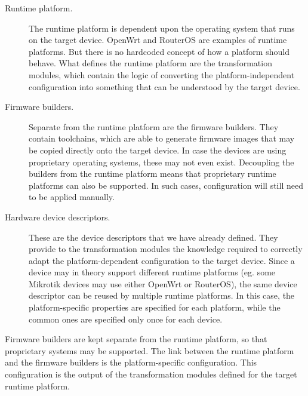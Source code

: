 \documentclass[5p,sort&compress]{elsarticle}
\begin{document}
\begin{description}
    \item[Runtime platform.] The runtime platform is dependent upon the operating system that runs on the target device.
    OpenWrt and RouterOS are examples of runtime platforms.
    But there is no hardcoded concept of how a platform should behave.
    What defines the runtime platform are the transformation modules, which contain the logic of converting the platform-independent configuration into something that can be understood by the target device.

    \item[Firmware builders.] Separate from the runtime platform are the firmware builders.
    They contain toolchains, which are able to generate firmware images that may be copied directly onto the target device.
    In case the devices are using proprietary operating systems, these may not even exist.
    Decoupling the builders from the runtime platform means that proprietary runtime platforms can also be supported.
    In such cases, configuration will still need to be applied manually.

    \item[Hardware device descriptors.] These are the device descriptors that we have already defined.
    They provide to the transformation modules the knowledge required to correctly adapt the platform-dependent configuration to the target device.
    Since a device may in theory support different runtime platforms (eg. some Mikrotik devices may use either OpenWrt or RouterOS), the same device descriptor can be reused by multiple runtime platforms.
    In this case, the platform-specific properties are specified for each platform, while the common ones are specified only once for each device.
\end{description}

Firmware builders are kept separate from the runtime platform, so that proprietary systems may be supported.
The link between the runtime platform and the firmware builders is the platform-specific configuration.
This configuration is the output of the transformation modules defined for the target runtime platform.
\end{document}

